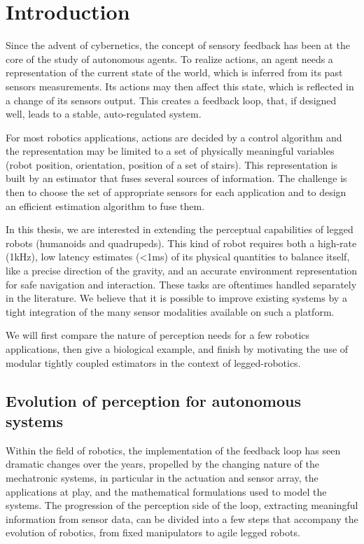 \chapter{Introduction}



Since the advent of cybernetics, the concept of sensory feedback has been at the core of the study of autonomous agents. To realize
actions, an agent needs a representation of the current state of the world, which is inferred from its past sensors measurements. Its actions may 
then affect this state, which is reflected in a change of its sensors output. This creates a feedback loop, that, if designed well, leads to a stable, 
auto-regulated system.

For most robotics applications, actions are decided by a control algorithm and 
the representation may be limited to a set of physically meaningful variables (robot position, orientation, position of a set of stairs). 
This representation is built by an estimator that fuses several sources of information. 
The challenge is then to choose the set of appropriate sensors for each application and to design an efficient estimation algorithm to fuse them.

In this thesis, we are interested in extending the perceptual capabilities of legged robots (humanoids and quadrupeds). This kind of robot requires both a high-rate (1kHz),
low latency estimates (<1ms) of its physical quantities to balance itself, like a precise direction of the gravity, and an accurate environment representation for safe navigation and interaction.
These tasks are oftentimes handled separately in the literature. We believe that it is possible to improve existing systems by a tight integration of the
many sensor modalities available on such a platform.

We will first compare the nature of perception needs for a few robotics applications, then give a biological example, and finish by motivating the use of 
modular tightly coupled estimators in the context of legged-robotics.



\section{Evolution of perception for autonomous systems}

Within the field of robotics, the implementation of the feedback loop has seen dramatic changes over the years, propelled by the changing nature 
of the mechatronic systems, in particular in the actuation and sensor array, the applications at play, and the mathematical formulations
used to model the systems. The progression of the perception side of the loop, extracting meaningful information from sensor data, can be divided into a few
steps that accompany the evolution of robotics, from fixed manipulators to agile legged robots. 


